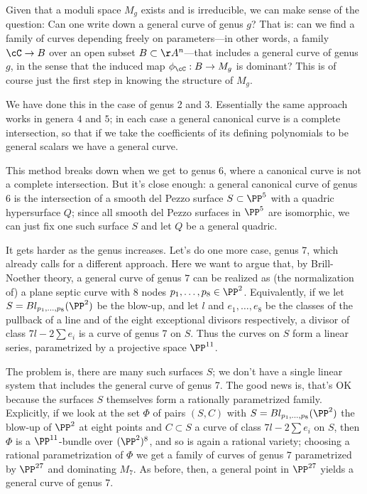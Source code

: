 Given that a moduli space $M_g$ exists and is irreducible, we can make sense of the question: Can one write down a general curve of genus $g$?
That is: can we find a family of curves depending freely on parameters---in other words, a family $\cC \to B$ over an open subset $B \subset \AA^n$---that includes a general curve of genus $g$, in the sense that the induced map $\phi_\cC : B \to M_g$ is dominant? This is of course just the first step in knowing the structure of $M_g$.

We have done this in the case of genus 2 and 3. Essentially
the same approach works in genera $4$ and $5$; in each case a general canonical curve is a complete intersection, so that if we take the coefficients of its defining polynomials to be general scalars we have a general curve.

This method breaks down when we get to genus 6, where a canonical curve is not a complete intersection. But it's close enough: a general canonical curve of genus 6 is the intersection of a smooth del Pezzo surface $S \subset \PP^5$ with a quadric hypersurface $Q$; since all smooth del Pezzo surfaces in $\PP^5$ are isomorphic, we can just fix one such surface $S$ and let $Q$ be a general quadric.

It gets harder as the genus increases. Let's do one more case, genus 7, which already calls for a different approach. Here we want to argue that, by Brill-Noether theory, a general curve of genus $7$ can be realized as (the normalization of) a plane septic curve with 8 nodes $p_1,\dots,p_8 \in \PP^2$. Equivalently, if we let $S = Bl_{p_1,\dots,p_8}(\PP^2)$ be the blow-up, and let $l$ and $e_1,\dots,e_8$ be the classes of the pullback of a line and of the eight exceptional divisors respectively, a divisor of class $7l - 2 \sum e_i$ is a curve of genus 7 on $S$. Thus the curves on $S$ form a linear series, parametrized by a projective space $\PP^{11}$.

The problem is, there are many such surfaces $S$; we don't have a single linear system that includes the general curve of genus 7. The good news is, that's OK because the surfaces $S$ themselves form a rationally parametrized family. Explicitly, if we look at the set $\Phi$ of pairs $(S, C)$ with $S = Bl_{p_1,\dots,p_8}(\PP^2)$  the blow-up of $\PP^2$ at eight points and $C \subset S$ a curve of class $7l - 2 \sum e_i$ on $S$, then $\Phi$ is a $\PP^{11}$-bundle over $(\PP^2)^8$, and so is again a rational variety; choosing a rational parametrization of $\Phi$ we get a family of curves of genus $7$ parametrized by $\PP^{27}$ and dominating $M_7$. As before, then, a general point in $\PP^{27}$ yields a general curve of genus 7.

